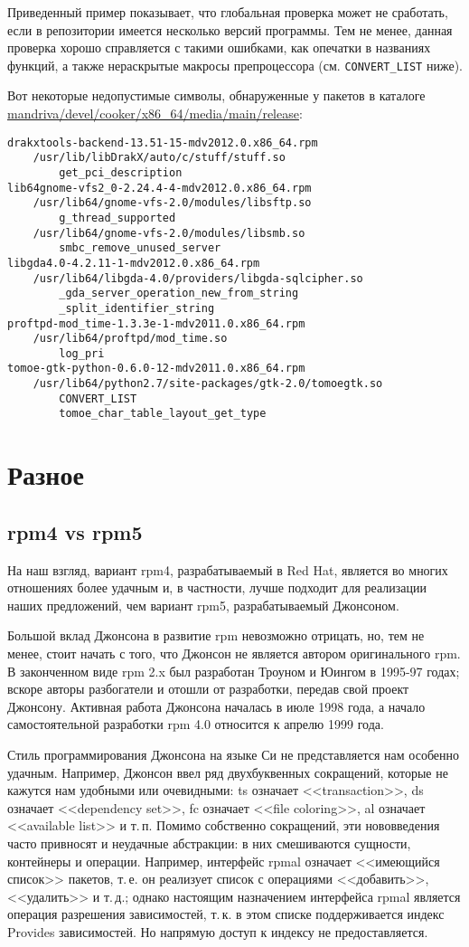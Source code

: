 \documentclass[russian,a4paper,12pt,titlepage]{article}
\begin{document}
Приведенный пример показывает, что глобальная проверка может не сработать, если в репозитории имеется несколько версий
программы.  Тем не менее, данная проверка хорошо справляется с такими ошибками, как опечатки в названиях функций,
а также нераскрытые макросы препроцессора (см. \verb|CONVERT_LIST| ниже).

Вот некоторые недопустимые символы, обнаруженные у пакетов в каталоге
\url{mandriva/devel/cooker/x86_64/media/main/release}:
\begin{verbatim}
drakxtools-backend-13.51-15-mdv2012.0.x86_64.rpm
    /usr/lib/libDrakX/auto/c/stuff/stuff.so
        get_pci_description
lib64gnome-vfs2_0-2.24.4-4-mdv2012.0.x86_64.rpm
    /usr/lib64/gnome-vfs-2.0/modules/libsftp.so
        g_thread_supported
    /usr/lib64/gnome-vfs-2.0/modules/libsmb.so
        smbc_remove_unused_server
libgda4.0-4.2.11-1-mdv2012.0.x86_64.rpm
    /usr/lib64/libgda-4.0/providers/libgda-sqlcipher.so
        _gda_server_operation_new_from_string
        _split_identifier_string
proftpd-mod_time-1.3.3e-1-mdv2011.0.x86_64.rpm
    /usr/lib64/proftpd/mod_time.so
        log_pri
tomoe-gtk-python-0.6.0-12-mdv2011.0.x86_64.rpm
    /usr/lib64/python2.7/site-packages/gtk-2.0/tomoegtk.so
        CONVERT_LIST
        tomoe_char_table_layout_get_type
\end{verbatim}

\section{Разное}

\subsection{rpm4 vs rpm5}
На наш взгляд, вариант rpm4, разрабатываемый в Red Hat, является во многих отношениях более удачным и, в частности,
лучше подходит для реализации наших предложений, чем вариант rpm5, разрабатываемый Джонсоном.

Большой вклад Джонсона в развитие rpm невозможно отрицать, но, тем не менее, стоит начать с того, что Джонсон
не является автором оригинального rpm.  В законченном виде rpm 2.x был разработан Троуном и Юингом в 1995-97 годах;
вскоре авторы разбогатели и отошли от разработки, передав свой проект Джонсону.  Активная работа Джонсона началась
в июле 1998 года, а начало самостоятельной разработки rpm 4.0 относится к апрелю 1999 года.

Стиль программирования Джонсона на языке Си не представляется нам особенно удачным.  Например, Джонсон ввел ряд
двухбуквенных сокращений, которые не кажутся нам удобными или очевидными: ts означает <<transaction>>, ds означает <<dependency set>>,
fc означает <<file coloring>>, al означает <<available list>> и т.\,п.  Помимо собственно сокращений, эти нововведения часто
привносят и неудачные абстракции: в них смешиваются сущности, контейнеры и операции.  Например, интерфейс rpmal означает
<<имеющийся список>> пакетов, т.\,е. он реализует список с операциями <<добавить>>, <<удалить>> и т.\,д.; однако настоящим назначением
интерфейса rpmal является операция разрешения зависимостей, т.\,к. в этом списке поддерживается индекс Provides зависимостей.
Но напрямую доступ к индексу не предоставляется.
\end{document}
